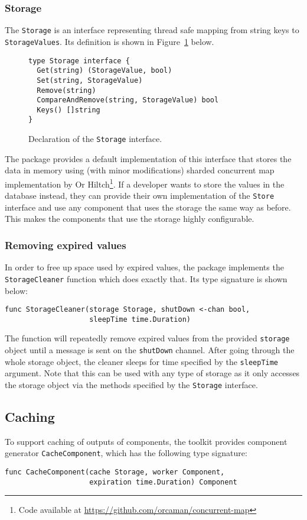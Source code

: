 \subsubsection{Storage}
The \texttt{Storage} is an interface representing thread safe mapping from string keys
to \texttt{StorageValues}. Its definition is shown in Figure~\ref{fig:Storage} below.
\begin{figure}[h]
\centering
\begin{lstlisting}
type Storage interface {
  Get(string) (StorageValue, bool)
  Set(string, StorageValue)
  Remove(string)
  CompareAndRemove(string, StorageValue) bool
  Keys() []string
}
\end{lstlisting}
\caption[scale=1.0]{Declaration of the \texttt{Storage} interface.}
\label{fig:Storage}
\end{figure}
The package provides a default implementation of this interface that
stores the data in memory using (with minor modifications) sharded concurrent map implementation
by Or Hiltch\footnote{Code available at \url{https://github.com/orcaman/concurrent-map}}.
If a developer wants to store the values in the 
database instead, they can provide their own implementation of the 
\texttt{Store} interface
and use any component that uses the storage the same way as before.
This makes the components that use the storage highly configurable.

\subsubsection{Removing expired values}
In order to free up space used by expired values, the package implements the
\texttt{StorageCleaner} function which does exactly that. Its type signature
is shown below:
\begin{lstlisting}
func StorageCleaner(storage Storage, shutDown <-chan bool, 
                    sleepTime time.Duration)
\end{lstlisting}
The function will repeatedly remove expired values from the provided
\texttt{storage} object until a message is sent on the \texttt{shutDown}
channel. After going through the whole storage object, the cleaner 
sleeps for time specified by the \texttt{sleepTime} argument.
Note that this can be used with any type of storage as it only accesses
the storage object via the methods specified by the \texttt{Storage} 
interface.

\subsection{Caching}
To support caching of outputs of components, the toolkit provides
component generator \texttt{CacheComponent}, which has the following type
signature:
\begin{lstlisting}
func CacheComponent(cache Storage, worker Component, 
                    expiration time.Duration) Component
\end{lstlisting}

